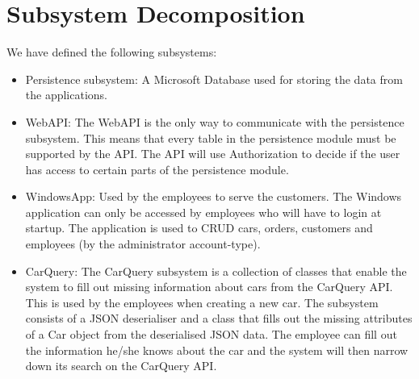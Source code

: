 \section{Subsystem Decomposition}
We have defined the following subsystems:
\begin{itemize}
	\item Persistence subsystem: A Microsoft Database used for storing the data from the applications.
	\item WebAPI: The WebAPI is the only way to communicate with the persistence subsystem. This means that every table in the persistence module must be supported by the API. The API will use Authorization to decide if the user has access to certain parts of the persistence module.
	\item WindowsApp: Used by the employees to serve the customers. The Windows application can only be accessed by employees who will have to login at startup. The application is used to CRUD cars, orders, customers and employees (by the administrator account-type).
	\item CarQuery: The CarQuery subsystem is a collection of classes that enable the system to fill out missing information about cars from the CarQuery API. \\
	This is used by the employees when creating a new car. The subsystem consists of a JSON deserialiser and a class that fills out the missing attributes of a Car object from the deserialised JSON data. 
	The employee can fill out the information he/she knows about the car and the system will then narrow down its search on the CarQuery API. 
\end{itemize}